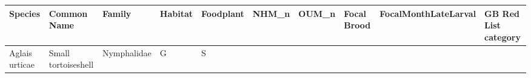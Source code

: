 \documentclass[
]{article}
\newcounter{none} %
\begin{document}
{\def\LTcaptype{none} %
\begin{longtable}[]{@{}
  >{\raggedright\arraybackslash}p{}
  >{\raggedright\arraybackslash}p{}
  >{\raggedright\arraybackslash}p{}
  >{\raggedright\arraybackslash}p{}
  >{\raggedright\arraybackslash}p{}
  >{\raggedleft\arraybackslash}p{}
  >{\raggedleft\arraybackslash}p{}
  >{\raggedright\arraybackslash}p{}
  >{\raggedright\arraybackslash}p{}
  >{\raggedright\arraybackslash}p{}@{}}
\toprule\noalign{}
\begin{minipage}[b]{\linewidth}\raggedright
Species
\end{minipage} & \begin{minipage}[b]{\linewidth}\raggedright
Common Name
\end{minipage} & \begin{minipage}[b]{\linewidth}\raggedright
Family
\end{minipage} & \begin{minipage}[b]{\linewidth}\raggedright
Habitat
\end{minipage} & \begin{minipage}[b]{\linewidth}\raggedright
Foodplant
\end{minipage} & \begin{minipage}[b]{\linewidth}\raggedleft
NHM\_n
\end{minipage} & \begin{minipage}[b]{\linewidth}\raggedleft
OUM\_n
\end{minipage} & \begin{minipage}[b]{\linewidth}\raggedright
Focal Brood
\end{minipage} & \begin{minipage}[b]{\linewidth}\raggedright
FocalMonthLateLarval
\end{minipage} & \begin{minipage}[b]{\linewidth}\raggedright
GB Red List category
\end{minipage} \\
\midrule\noalign{}
\endhead
\bottomrule\noalign{}
\endlastfoot
Aglais urticae & Small tortoiseshell & Nymphalidae & G & S & 971 & 34 &

\end{longtable}}
\end{document}
